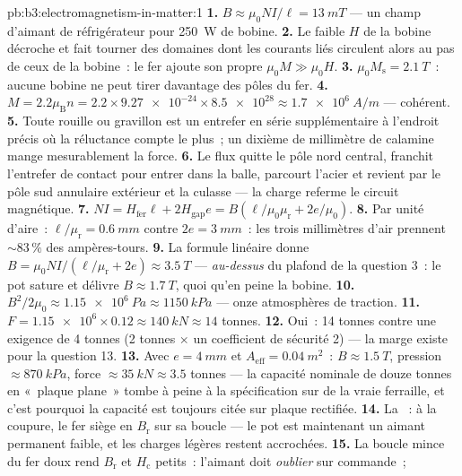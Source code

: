 \begin{solution}{pb:b3:electromagnetism-in-matter:1}
\textbf{1.} $B \approx \mu_0NI/\ell = \qty{13}{mT}$ --- un champ
d'aimant de réfrigérateur pour \qty{250}{W} de bobine.
\textbf{2.} Le faible $H$ de la bobine décroche et fait tourner des
domaines dont les courants liés circulent alors au pas de ceux de la
bobine~: le fer ajoute son propre $\mu_0M \gg \mu_0H$.
\textbf{3.} $\mu_0M_{\text{s}} = \qty{2.1}{T}$~: aucune bobine ne
peut tirer davantage des pôles du fer.
\textbf{4.} $M = 2.2\mu_{\text{B}}n = 2.2\times\num{9.27e-24}
\times\num{8.5e28} \approx \qty{1.7e6}{A/m}$ --- cohérent.
\textbf{5.} Toute rouille ou gravillon est un entrefer en série
supplémentaire à l'endroit précis où la réluctance compte le plus~;
un dixième de millimètre de calamine mange mesurablement la force.
\textbf{6.} Le flux quitte le pôle nord central, franchit
l'entrefer de contact pour entrer dans la balle, parcourt l'acier et
revient par le pôle sud annulaire extérieur et la culasse --- la
charge referme le circuit magnétique.
\textbf{7.} $NI = H_{\text{fer}}\ell + 2H_{\text{gap}}e =
B(\ell/\mu_0\mu_{\text{r}} + 2e/\mu_0)$.
\textbf{8.} Par unité d'aire~: $\ell/\mu_{\text{r}} = \qty{0.6}{mm}$
contre $2e = \qty{3}{mm}$~: les trois millimètres d'air prennent
$\sim83\,\%$ des ampères-tours.
\textbf{9.} La formule linéaire donne $B = \mu_0NI/(\ell/
\mu_{\text{r}} + 2e) \approx \qty{3.5}{T}$ --- \emph{au-dessus} du
plafond de la question 3~: le pot sature et délivre $B \approx
\qty{1.7}{T}$, quoi qu'en peine la bobine.
\textbf{10.} $B^2/2\mu_0 \approx \qty{1.15e6}{Pa} \approx
\qty{1150}{kPa}$ --- onze atmosphères de traction.
\textbf{11.} $F = \num{1.15e6}\times0.12 \approx \qty{140}{kN}
\approx 14$ tonnes.
\textbf{12.} Oui~: 14 tonnes contre une exigence de 4 tonnes
(2 tonnes $\times$ un coefficient de sécurité 2) --- la marge existe
pour la question 13.
\textbf{13.} Avec $e = \qty{4}{mm}$ et $A_{\text{eff}} =
\qty{0.04}{m^2}$~: $B \approx \qty{1.5}{T}$, pression
$\approx\qty{870}{kPa}$, force $\approx\qty{35}{kN} \approx 3.5$
tonnes --- la capacité nominale de douze tonnes en «~plaque plane~»
tombe à peine à la spécification sur de la vraie ferraille, et c'est
pourquoi la capacité est toujours citée sur plaque rectifiée.
\textbf{14.} La ~: à la coupure, le fer siège en
$B_{\text{r}}$ sur sa boucle --- le pot est maintenant un aimant
permanent faible, et les charges légères restent accrochées.
\textbf{15.} La boucle mince du fer doux rend $B_{\text{r}}$ et
$H_{\text{c}}$ petits~: l'aimant doit \emph{oublier} sur commande~;

\end{solution}
